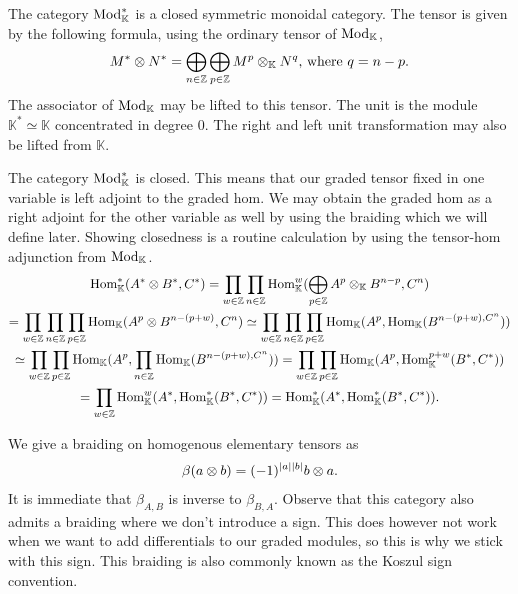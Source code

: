 \documentclass[../thesis.tex]{subfiles}
\begin{document}
            The category $\tt{Mod}_\mathbb{K}^*$ is a closed symmetric monoidal category. The tensor is given by the following formula, using the ordinary tensor of $\tt{Mod}_\mathbb{K}$,
            \begin{align*}
                M^*\otimes N^* = \bigoplus_{n\in \mathbb{Z}}\bigoplus_{p\in\mathbb{Z}}M^p\otimes_\mathbb{K} N^q\tt{, where }q = n - p\tt{.}
            \end{align*}
            The associator of $\tt{Mod}_\mathbb{K}$ may be lifted to this tensor. The unit is the module $\mathbb{K}^* \simeq \mathbb{K}$ concentrated in degree $0$. The right and left unit transformation may also be lifted from $\mathbb{K}$. 
            
            The category $\tt{Mod}_\mathbb{K}^*$ is closed. This means that our graded tensor fixed in one variable is left adjoint to the graded hom. We may obtain the graded hom as a right adjoint for the other variable as well by using the braiding which we will define later. Showing closedness is a routine calculation by using the tensor-hom adjunction from $\tt{Mod}_\mathbb{K}$.
            \begin{multline*}
                \tt{Hom}_\mathbb{K}^*(A^*\otimes B^*, C^*) = \prod_{w\in\mathbb{Z}}\prod_{n\in\mathbb{Z}}\tt{Hom}_\mathbb{K}^w(\bigoplus_{p\in\mathbb{Z}}A^p\otimes_\mathbb{K}B^{n-p},C^n) \\
                = \prod_{w\in\mathbb{Z}}\prod_{n\in\mathbb{Z}}\prod_{p\in\mathbb{Z}}\tt{Hom}_\mathbb{K}(A^p\otimes B^{n-(p+w)},C^n) \simeq \prod_{w\in\mathbb{Z}}\prod_{n\in\mathbb{Z}}\prod_{p\in\mathbb{Z}}\tt{Hom}_\mathbb{K}(A^p,\tt{Hom}_\mathbb{K}(B^{n-(p+w),C^n})) \\
                \simeq \prod_{w\in\mathbb{Z}}\prod_{p\in\mathbb{Z}}\tt{Hom}_\mathbb{K}(A^p, \prod_{n\in\mathbb{Z}}\tt{Hom}_\mathbb{K}(B^{n-(p+w),C^n})) = \prod_{w\in\mathbb{Z}}\prod_{p\in\mathbb{Z}}\tt{Hom}_\mathbb{K}(A^p,\tt{Hom}_\mathbb{K}^{p+w}(B^*,C^*)) \\
                = \prod_{w\in\mathbb{Z}}\tt{Hom}_\mathbb{K}^w(A^*,\tt{Hom}_\mathbb{K}^*(B^*,C^*)) = \tt{Hom}_\mathbb{K}^*(A^*,\tt{Hom}_\mathbb{K}^*(B^*,C^*))\tt{.}
            \end{multline*}
            
            We give a braiding on homogenous elementary tensors as
            \begin{align*}
                \beta(a\otimes b) = (-1)^{|a||b|}b\otimes a\tt{.}
            \end{align*}
            It is immediate that $\beta_{A,B}$ is inverse to $\beta_{B,A}$. Observe that this category also admits a braiding where we don't introduce a sign. This does however not work when we want to add differentials to our graded modules, so this is why we stick with this sign. This braiding is also commonly known as the Koszul sign convention. 
\end{document}
